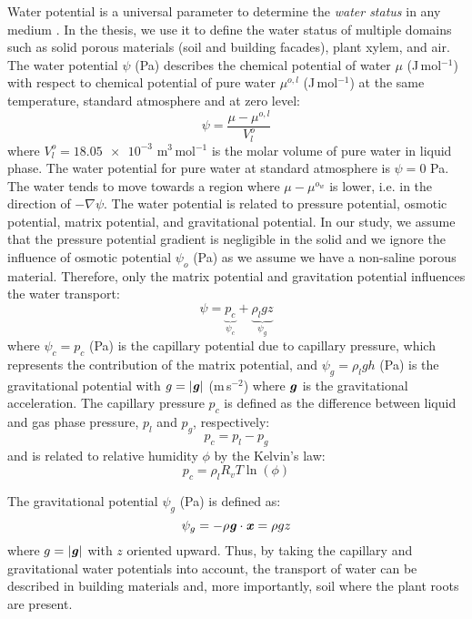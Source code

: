 Water potential is a universal parameter to determine the \textit{water status} in any medium \citep{nobel2009physicochemical}. In the thesis, we use it to define the water status of multiple domains such as solid porous materials (soil and building facades), plant xylem, and air. The water potential $\psi$ (Pa) describes the chemical potential of water $\mu$ (J\,mol$^{-1}$) with respect to chemical potential of pure water $\mu^{o,l}$ (J\,mol$^{-1}$) at the same temperature, standard atmosphere and at zero level:
\begin{equation}
\psi = \frac{\mu - \mu^{o,l}}{V^o_l}
\end{equation}
where $V^o_l = 18.05 \num{e-3}$ m$^3$\,mol$^{-1}$ is the molar volume of pure water in liquid phase. The water potential for pure water at standard atmosphere is $\psi = 0$ Pa. The water tends to move towards a region where $\mu-\mu^{o_w}$ is lower, i.e. in the direction of $-\nabla\psi$. The water potential is related to pressure potential, osmotic potential, matrix potential, and gravitational potential. In our study, we assume that the pressure potential gradient is negligible in the solid and we ignore the influence of osmotic potential $\psi_o$ (Pa) as we assume we have a non-saline porous material. Therefore, only the matrix potential and gravitation potential influences the water transport:
\begin{equation}
\psi = \underbrace{p_c}_{\psi_c} + \underbrace{\rho_l g z}_{\psi_g}
\end{equation}
where $\psi_c = p_c$ (Pa) is the capillary potential due to capillary pressure, which represents the contribution of the matrix potential, and $\psi_g = \rho_l g h$ (Pa) is the gravitational potential with $g = |\textbf{\textit{g}}|$ (m\,s$^{-2}$) where $\textbf{\textit{g}}$ is the gravitational acceleration. The capillary pressure $p_c$ is defined as the difference between liquid and gas phase pressure, $p_l$ and $p_g$, respectively:
\begin{equation}
p_c =  p_l - p_g
\end{equation}
and is related to relative humidity $\phi$ by the Kelvin's law:
\begin{equation}
p_c = \rho_l R_v T \ln \left(\phi\right)
\end{equation}

The gravitational potential $\psi_g$ (Pa) is defined as:
\begin{equation}
\psi_g = - \rho \textbf{\textit{g}} \cdot \textbf{\textit{x}} = \rho g z
\end{equation}
where $g = |\textbf{\textit{g}}|$ with $z$ oriented upward. Thus, by taking the capillary and gravitational water potentials into account, the transport of water can be described in building materials and, more importantly, soil where the plant roots are present.

